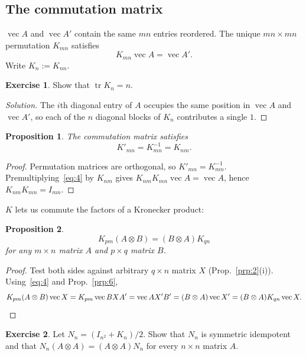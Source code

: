 \documentclass[14pt]{extarticle}
\theoremstyle{plain}
\newtheorem{proposition}{Proposition}
\theoremstyle{definition}
\newtheorem{exercise}{Exercise}
\theoremstyle{remark}
\newenvironment{solution}{%
  \begin{proof}[Solution]%
}{%
  \end{proof}%
}
\DeclareMathOperator{\tr}{tr}
\DeclareMathOperator{\avec}{vec}
\begin{document}
\subsection{The commutation matrix}\label{sec:2.5}

$\avec A$ and $\avec A'$ contain the same $mn$ entries reordered. The unique $mn \times mn$ permutation $K_{mn}$ satisfies
\begin{equation}\label{eq:4}
K_{mn} \avec A = \avec A'.
\end{equation}
Write $K_n := K_{nn}$.

\begin{exercise}\label{exer:4}
Show that $\tr K_n = n$.
\end{exercise}

\begin{solution}
The $i$th diagonal entry of $A$ occupies the same position in $\avec A$ and $\avec A'$, so each of the $n$ diagonal blocks of $K_n$ contributes a single $1$.
\end{solution}

\begin{proposition}\label{prp:7}
The commutation matrix satisfies
\[
K'_{mn} = K^{-1}_{mn} = K_{nm}.
\]
\end{proposition}

\begin{proof}
Permutation matrices are orthogonal, so $K'_{mn} = K^{-1}_{mn}$. Premultiplying~\eqref{eq:4} by $K_{nm}$ gives $K_{nm}K_{mn}\avec A = \avec A$, hence $K_{nm}K_{mn} = I_{mn}$.
\end{proof}

$K$ lets us commute the factors of a Kronecker product:

\begin{proposition}\label{prp:8}
\[
K_{pm}(A \otimes B) = (B \otimes A)K_{qn}
\]
for any $m \times n$ matrix $A$ and $p \times q$ matrix $B$.
\end{proposition}

\begin{proof}
Test both sides against arbitrary $q\times n$ matrix $X$ (Prop.~\ref{prp:2}(i)). Using~\eqref{eq:4} and Prop.~\ref{prp:6},
\[
K_{pm}(A \otimes B) \avec X = K_{pm} \avec BXA' = \avec AX'B' = (B \otimes A) \avec X' = (B \otimes A) K_{qn} \avec X. \qedhere
\]
\end{proof}

\begin{exercise}\label{exer:5}
Let $N_n = (I_{n^2} + K_n)/2$. Show that $N_n$ is symmetric idempotent and that $N_n(A \otimes A) = (A \otimes A) N_n$ for every $n \times n$ matrix $A$.
\end{exercise}
\end{document}
